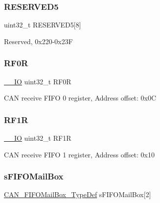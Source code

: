 \subsubsection{\texorpdfstring{R\+E\+S\+E\+R\+V\+E\+D5}{RESERVED5}}
{\footnotesize\ttfamily uint32\+\_\+t R\+E\+S\+E\+R\+V\+E\+D5\mbox{[}8\mbox{]}}

Reserved, 0x220-\/0x23F \mbox{\label{struct_c_a_n___type_def_accf4141cee239380d0ad4634ee21dbf6}} 
\subsubsection{\texorpdfstring{R\+F0R}{RF0R}}
{\footnotesize\ttfamily \mbox{\hyperlink{core__sc300_8h_aec43007d9998a0a0e01faede4133d6be}{\+\_\+\+\_\+\+IO}} uint32\+\_\+t R\+F0R}

C\+AN receive F\+I\+FO 0 register, Address offset\+: 0x0C \mbox{\label{struct_c_a_n___type_def_a02b589bb589df4f39e549dca4d5abb08}} 
\subsubsection{\texorpdfstring{R\+F1R}{RF1R}}
{\footnotesize\ttfamily \mbox{\hyperlink{core__sc300_8h_aec43007d9998a0a0e01faede4133d6be}{\+\_\+\+\_\+\+IO}} uint32\+\_\+t R\+F1R}

C\+AN receive F\+I\+FO 1 register, Address offset\+: 0x10 \mbox{\label{struct_c_a_n___type_def_a21b030b34e131f7ef6ea273416449fe4}} 
\subsubsection{\texorpdfstring{s\+F\+I\+F\+O\+Mail\+Box}{sFIFOMailBox}}
{\footnotesize\ttfamily \mbox{\hyperlink{struct_c_a_n___f_i_f_o_mail_box___type_def}{C\+A\+N\+\_\+\+F\+I\+F\+O\+Mail\+Box\+\_\+\+Type\+Def}} s\+F\+I\+F\+O\+Mail\+Box\mbox{[}2\mbox{]}}

